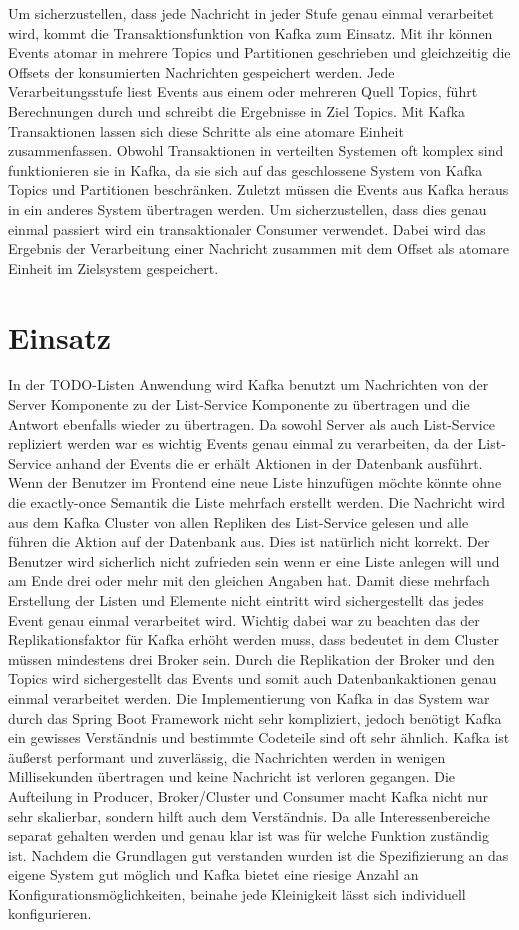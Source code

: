 Um sicherzustellen, dass jede Nachricht in jeder Stufe genau einmal verarbeitet wird, kommt die Transaktionsfunktion von Kafka zum Einsatz. Mit ihr können Events atomar in mehrere Topics und Partitionen geschrieben und gleichzeitig die Offsets der konsumierten Nachrichten gespeichert werden. Jede Verarbeitungsstufe liest Events aus einem oder mehreren Quell Topics, führt Berechnungen durch und schreibt die Ergebnisse in Ziel Topics. Mit Kafka Transaktionen lassen sich diese Schritte als eine atomare Einheit zusammenfassen. Obwohl Transaktionen in verteilten Systemen oft komplex sind funktionieren sie in Kafka, da sie sich auf das geschlossene System von Kafka Topics und Partitionen beschränken. Zuletzt müssen die Events aus Kafka heraus in ein anderes System übertragen werden. Um sicherzustellen, dass dies genau einmal passiert wird ein transaktionaler Consumer verwendet. Dabei wird das Ergebnis der Verarbeitung einer Nachricht zusammen mit dem Offset als atomare Einheit im Zielsystem gespeichert. \autocite{ExactlyOnce}

\section{Einsatz}
In der TODO-Listen Anwendung wird Kafka benutzt um Nachrichten von der Server Komponente zu der List-Service Komponente zu übertragen und die Antwort ebenfalls wieder zu übertragen. Da sowohl Server als auch List-Service repliziert werden war es wichtig Events genau einmal zu verarbeiten, da der List-Service anhand der Events die er erhält Aktionen in der Datenbank ausführt. Wenn der Benutzer im Frontend eine neue Liste hinzufügen möchte könnte ohne die exactly-once Semantik die Liste mehrfach erstellt werden. Die Nachricht wird aus dem Kafka Cluster von allen Repliken des List-Service gelesen und alle führen die Aktion auf der Datenbank aus. Dies ist natürlich nicht korrekt. Der Benutzer wird sicherlich nicht zufrieden sein wenn er eine Liste anlegen will und am Ende drei oder mehr mit den gleichen Angaben hat. Damit diese mehrfach Erstellung der Listen und Elemente nicht eintritt wird sichergestellt das jedes Event genau einmal verarbeitet wird. Wichtig dabei war zu beachten das der Replikationsfaktor für Kafka erhöht werden muss, dass bedeutet in dem Cluster müssen mindestens drei Broker sein. Durch die Replikation der Broker und den Topics wird sichergestellt das Events und somit auch Datenbankaktionen genau einmal verarbeitet werden. Die Implementierung von Kafka in das System war durch das Spring Boot Framework nicht sehr kompliziert, jedoch benötigt Kafka ein gewisses Verständnis und bestimmte Codeteile sind oft sehr ähnlich. Kafka ist äußerst performant und zuverlässig, die Nachrichten werden in wenigen Millisekunden übertragen und keine Nachricht ist verloren gegangen. Die Aufteilung in Producer, Broker/Cluster und Consumer macht Kafka nicht nur sehr skalierbar, sondern hilft auch dem Verständnis. Da alle Interessenbereiche separat gehalten werden und genau klar ist was für welche Funktion zuständig ist. Nachdem die Grundlagen gut verstanden wurden ist die Spezifizierung an das eigene System gut möglich und Kafka bietet eine riesige Anzahl an Konfigurationsmöglichkeiten, beinahe jede Kleinigkeit lässt sich individuell konfigurieren.

